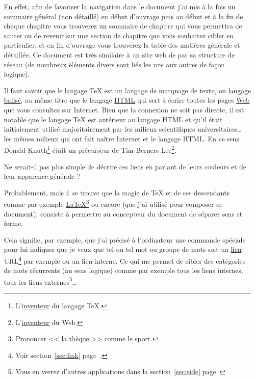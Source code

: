 En effet, afin de favoriser la navigation dans le document j'ai mis à la
fois un sommaire général (non détaillé) en début d'ouvrage puis au début
et à la fin de chaque chapitre vous trouverez un sommaire de chapitre
qui vous permettra de sauter ou de revenir sur une section de chapitre
que vous souhaitez cibler en particulier, et en fin d'ouvrage vous
trouverez la table des matières générale et détaillée. Ce document est très
similaire à un site web de par sa structure de réseau (de nombreux
éléments divers sont liés les uns aux autres de façon logique).

Il faut savoir que le langage
\href{https://fr.wikipedia.org/wiki/TeX}{\TeX} est un langage de
marquage de texte, ou \underline{langage balisé}, au même titre que le 
langage \href{https://fr.wikipedia.org/wiki/Langage_de_balisage\#Langage_HTML}{HTML}
qui sert à écrire toutes les pages  \href{https://fr.wikipedia.org/wiki/World_Wide_Web}{Web}
que vous consultez sur Internet. Bien que la connexion ne soit pas
directe, il est notable que le langage \TeX{} est antérieur au langage
HTML et qu'il était initialement utilisé majoritairement par les
milieux scientifiques universitaires\dots\xspace{} les mêmes milieux qui ont
fait naître Internet et le langage HTML. En ce sens Donald
Knuth\footnote{L'\href{https://fr.wikipedia.org/wiki/Donald_Knuth}{inventeur} du langage \TeX{}.} était un précurseur de
Tim Berners Lee\footnote{L'\href{https://fr.wikipedia.org/wiki/Tim_Berners-Lee}{inventeur} du Web.}.

Ne serait-il pas plus simple de décrire ces liens en parlant de leurs
couleurs et de leur apparence générale ?

Probablement, mais il se trouve que la magie de \TeX{} et de ses
descendants comme par exemple
\href{https://fr.wikipedia.org/wiki/LaTeX}{\LaTeX}\footnote{Prononcer
  << la
  \href{https://fr.wikipedia.org/wiki/Th\%C3\%A8que_(sport)}{thèque}
  >> comme le sport.} ou encore 
\href{https://en.wikipedia.org/wiki/XeTeX}{\XeLaTeX} (que j'ai utilisé
pour composer ce document), consiste à
permettre au concepteur du document de séparer sens et forme. 

Cela signifie, par exemple, que j'ai précisé à l'ordinateur une
commande spéciale pour lui indiquer que je veux que tel ou tel mot ou
groupe de mots soit un \hyperlink{url}{lien} URL\footnote{Voir
  section~\ref{sec:link}   page~\pageref{sec:link}.} par exemple ou un
lien interne. Ce qui me permet de cibler des catégories de mots
récurrents (au sens logique) comme par exemple tous les liens
internes, tous les liens externes\footnote{Vous en verrez d'autres
  applications dans la section~\ref{sec:side}
  page~\pageref{sec:side}}\dots\xspace  

